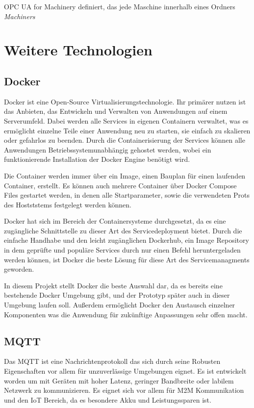 \documentclass[a4paper, 12pt, oneside]{scrbook}
\begin{document}
		OPC UA for Machinery definiert, das jede Maschine innerhalb eines Ordners \textit{Machiners} 


	\section{Weitere Technologien}
		\subsection{Docker}
		
		Docker ist eine Open-Source Virtualisierungstechnologie. Ihr primärer nutzen ist das Anbieten, das Entwickeln und Verwalten von Anwendungen auf einem Serverumfeld. Dabei werden alle Services in eigenen Containern verwaltet, was es ermöglicht einzelne Teile einer Anwendung neu zu starten, sie einfach zu skalieren oder gefahrlos zu beenden. Durch die Containerisierung der Services können alle Anwendungen Betriebssystemunabhängig gehostet werden, wobei ein funktionierende Installation der Docker Engine benötigt wird. 
		
		Die Container werden immer über ein Image, einen Bauplan für einen laufenden Container, erstellt. Es können auch mehrere Container über Docker Compose Files gestartet werden, in denen alle Startparameter, sowie die verwendeten Prots des Hostststems festgelegt werden können. 
		
		Docker hat sich im Bereich der Containersysteme durchgesetzt, da es eine zugängliche Schnittstelle zu dieser Art des Servicedeployment bietet. Durch die einfache Handhabe und den leicht zugänglichen Dockerhub, ein Image Repository in dem geprüfte und populäre Services durch nur einen Befehl heruntergeladen werden können, ist Docker die beste Lösung für diese Art des Servicemanagments geworden.
		
		In diesem Projekt stellt Docker die beste Auswahl dar, da es bereits eine bestehende Docker Umgebung gibt, und der Prototyp später auch in dieser Umgebung laufen soll. Außerdem ermöglicht Docker den Austausch einzelner Komponenten was die Anwendung für zukünftige Anpassungen sehr offen macht.
		
		\subsection{MQTT}
		
		Das \ac{MQTT} ist eine Nachrichtenprotokoll das sich durch seine Robusten Eigenschaften vor allem für unzuverlässige Umgebungen eignet. Es ist entwickelt worden um mit Geräten mit hoher Latenz, geringer Bandbreite oder labilem Netzwerk zu kommunizieren. Es eignet sich vor allem für \ac{M2M} Kommunikation und den \ac{IoT} Bereich, da es besondere Akku und Leistungssparen ist. 
		
\end{document}
